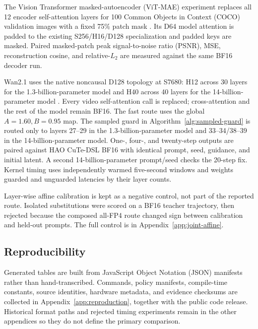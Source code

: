 The Vision Transformer masked-autoencoder (ViT-MAE) experiment replaces all
12 encoder self-attention layers for 100 Common Objects in Context (COCO)
validation images with a fixed 75\% patch mask
\cite{he2022mae,lin2014coco}. Its D64 model attention is padded to the existing
S256/H16/D128 specialization and padded keys are masked. Paired masked-patch
peak signal-to-noise ratio (PSNR), MSE, reconstruction cosine, and
relative-$L_2$ are measured against the same BF16 decoder run.

Wan2.1 uses the native noncausal D128 topology at S7680: H12 across 30 layers
for the 1.3-billion-parameter model and H40 across 40 layers for the
14-billion-parameter model \cite{wanteam2025wan}. Every video self-attention
call is replaced; cross-attention and the rest of the model remain BF16. The
fast route uses the global $A=1.60,B=0.95$ map. The sampled guard in
Algorithm~\ref{alg:sampled-guard} is routed only to layers 27--29 in the
1.3-billion-parameter model and 33--34/38--39 in the 14-billion-parameter
model. One-, four-, and twenty-step outputs are paired against HAO CuTe-DSL
BF16 with identical prompt, seed, guidance, and initial latent. A second
14-billion-parameter prompt/seed checks the 20-step fix. Kernel timing uses
independently warmed five-second windows and weights guarded and unguarded
latencies by their layer counts.

Layer-wise affine calibration is kept as a negative control, not part of the
reported route. Isolated substitutions were scored on a BF16 teacher
trajectory, then rejected because the composed all-FP4 route changed sign
between calibration and held-out prompts. The full control is in
Appendix~\ref{app:joint-affine}.

\subsection{Reproducibility}

Generated tables are built from JavaScript Object Notation (JSON) manifests
rather than hand-transcribed.
Commands, policy manifests, compile-time constants, source identities,
hardware metadata, and evidence checksums are collected in
Appendix~\ref{app:reproduction}, together with the public code release.
Historical format paths and rejected timing
experiments remain in the other appendices so they do not define the primary
comparison.
